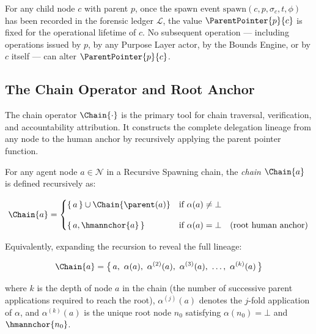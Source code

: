 \begin{prop}
\label{prop:parent-pointer-immutable}
For any child node $c$ with parent $p$, once the spawn event $\mathrm{spawn}(c, p, \sigma_c, t, \phi)$ has been recorded in the forensic ledger $\mathcal{L}$, the value $\ParentPointer{p}{c}$ is fixed for the operational lifetime of $c$. No subsequent operation --- including operations issued by $p$, by any Purpose Layer actor, by the Bounds Engine, or by $c$ itself --- can alter $\ParentPointer{p}{c}$.
\end{prop}

\subsection{The Chain Operator and Root Anchor}
\label{sec:chain-operator}

The chain operator $\Chain{\cdot}$ is the primary tool for chain traversal, verification, and accountability attribution. It constructs the complete delegation lineage from any node to the human anchor by recursively applying the parent pointer function.

\begin{dfn}
\label{def:chain-operator}
For any agent node $a \in \mathcal{N}$ in a Recursive Spawning chain, the \emph{chain} $\Chain{a}$ is defined recursively as:

\begin{equation}
\Chain{a} =
\begin{cases}
\{\,a\,\} \cup \Chain{\parent(a)} & \text{if } \alpha(a) \neq \bot \\[10pt]
\{\,a,\hmannchor{a}\,\} & \text{if } \alpha(a) = \bot \quad \text{(root human anchor)}
\end{cases}
\label{eq:chain-recursive}
\end{equation}

Equivalently, expanding the recursion to reveal the full lineage:

\begin{equation}
\Chain{a} = \bigl\{\, a,\ \alpha(a),\ \alpha^{(2)}(a),\ \alpha^{(3)}(a),\ \ldots,\ \alpha^{(k)}(a) \,\bigr\}
\label{eq:chain-expanded}
\end{equation}

where $k$ is the depth of node $a$ in the chain (the number of successive parent applications required to reach the root), $\alpha^{(j)}(a)$ denotes the $j$-fold application of $\alpha$, and $\alpha^{(k)}(a)$ is the unique root node $n_0$ satisfying $\alpha(n_0) = \bot$ and $\hmannchor{n_0}$.
\end{dfn}

